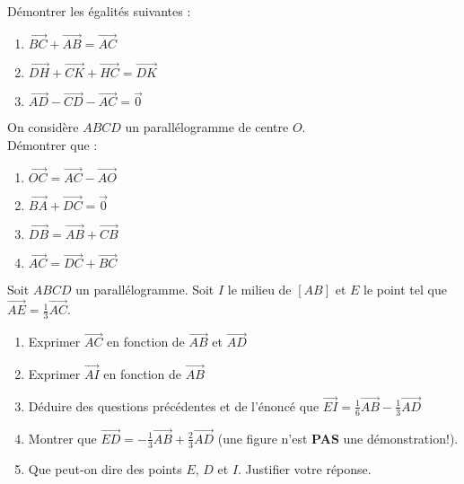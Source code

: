 \begin{exercice}
Démontrer les égalités suivantes :
\begin{enumerate}
\item $\overrightarrow{BC}+\overrightarrow{AB}=\overrightarrow{AC}$
\item $\overrightarrow{DH}+\overrightarrow{CK}+\overrightarrow{HC}=\overrightarrow{DK}$
\item $\overrightarrow{AD}-\overrightarrow{CD}-\overrightarrow{AC}=\overrightarrow{0}$
\end{enumerate}

\end{exercice}

\begin{exercice}
On considère $ABCD$ un parallélogramme de centre $O$.\\
Démontrer que :
\begin{enumerate}
\item $\overrightarrow{OC}=\overrightarrow{AC}-\overrightarrow{AO}$
\item $\overrightarrow{BA}+\overrightarrow{DC}=\vec{0}$
\item $\overrightarrow{DB}=\overrightarrow{AB}+\overrightarrow{CB}$
\item $\overrightarrow{AC}=\overrightarrow{DC}+\overrightarrow{BC}$
\end{enumerate}
\end{exercice}



\begin{exercice}
Soit $ABCD$ un parallélogramme. Soit $I$ le milieu de $[AB]$ et $E$ le point tel que $\overrightarrow{AE}=\frac{1}{3}\overrightarrow{AC}$.
\begin{enumerate}
\item Exprimer $\overrightarrow{AC}$ en fonction de $\overrightarrow{AB}$ et $\overrightarrow{AD}$
\item Exprimer $\overrightarrow{AI}$ en fonction de $\overrightarrow{AB}$
\item Déduire des questions précédentes et de l'énoncé que $\overrightarrow{EI}=\frac{1}{6}\overrightarrow{AB}-\frac{1}{3}\overrightarrow{AD}$
\item Montrer que $\overrightarrow{ED}=-\frac{1}{3}\overrightarrow{AB}+\frac{2}{3}\overrightarrow{AD}$ (une figure n'est \textbf{PAS} une démonstration!).
\item Que peut-on dire des points $E$, $D$ et $I$. Justifier votre réponse.
\end{enumerate}

\end{exercice}


